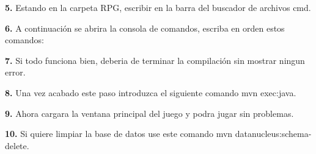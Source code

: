 {\bfseries{5.}} Estando en la carpeta RPG, escribir en la barra del buscador de archivos {\ttfamily cmd}.

{\bfseries{6.}} A continuación se abrira la consola de comandos, escriba en orden estos comandos\+: 
\begin{DoxyCode}{0}

\end{DoxyCode}


{\bfseries{7.}} Si todo funciona bien, deberia de terminar la compilación sin mostrar ningun error.

{\bfseries{8.}} Una vez acabado este paso introduzca el siguiente comando {\ttfamily mvn exec\+:java}.

{\bfseries{9.}} Ahora cargara la ventana principal del juego y podra jugar sin problemas.

{\bfseries{10.}} Si quiere limpiar la base de datos use este comando {\ttfamily mvn datanucleus\+:schema-\/delete}. 